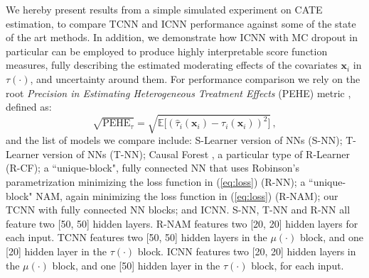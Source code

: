 \documentclass[nohyperref]{article}
\theoremstyle{plain}
\theoremstyle{definition}
\theoremstyle{remark}
\begin{document}
We hereby present results from a simple simulated experiment on CATE estimation, to compare TCNN and ICNN performance against some of the state of the art methods. In addition, we demonstrate how ICNN with MC dropout in particular can be employed to produce highly interpretable score function measures, fully describing the estimated moderating effects of the covariates $\bm{x}_i$ in $\tau(\cdot)$, and uncertainty around them. For performance comparison we rely on the root \emph{Precision in Estimating Heterogeneous Treatment Effects} (PEHE) metric \citep{hill_2011}, defined as:
\begin{equation} 
    \sqrt{\text{PEHE}_\tau} = \sqrt{ \mathbb{E} \big[ (\hat{\tau}_i (\bm{x}_i) - \tau_i (\bm{x}_i) )^2 \big] } \, ,
\end{equation}
and the list of models we compare include: S-Learner version of NNs (S-NN); T-Learner version of NNs (T-NN); Causal Forest \citep{athey_2019}, a particular type of R-Learner (R-CF); a ``unique-block", fully connected NN that uses Robinson's parametrization minimizing the loss function in (\ref{eq:loss}) (R-NN); a ``unique-block" NAM, again minimizing the loss function in (\ref{eq:loss}) (R-NAM); our TCNN with fully connected NN blocks; and ICNN. S-NN, T-NN and R-NN all feature two [50, 50] hidden layers. R-NAM features two [20, 20] hidden layers for each input. TCNN features two [50, 50] hidden layers in the $\mu(\cdot)$ block, and one [20] hidden layer in the $\tau(\cdot)$ block. ICNN features two [20, 20] hidden layers in the $\mu(\cdot)$ block, and one [50] hidden layer in the $\tau(\cdot)$ block, for each input.
\end{document}
